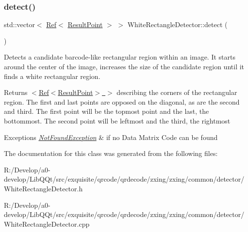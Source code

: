 \subsubsection{\texorpdfstring{detect()}{detect()}}
{\footnotesize\ttfamily std\+::vector$<$ \mbox{\hyperlink{classzxing_1_1_ref}{Ref}}$<$ \mbox{\hyperlink{classzxing_1_1_result_point}{Result\+Point}} $>$ $>$ White\+Rectangle\+Detector\+::detect (\begin{DoxyParamCaption}{ }\end{DoxyParamCaption})}

Detects a candidate barcode-\/like rectangular region within an image. It starts around the center of the image, increases the size of the candidate region until it finds a white rectangular region. 

\begin{DoxyReturn}{Returns}
\mbox{\hyperlink{}{$<$Ref$<$\+Result\+Point$>$ $>$}} describing the corners of the rectangular region. The first and last points are opposed on the diagonal, as are the second and third. The first point will be the topmost point and the last, the bottommost. The second point will be leftmost and the third, the rightmost 
\end{DoxyReturn}

\begin{DoxyExceptions}{Exceptions}
{\em \mbox{\hyperlink{classzxing_1_1_not_found_exception}{Not\+Found\+Exception}}} & if no Data Matrix Code can be found \\
\hline
\end{DoxyExceptions}


The documentation for this class was generated from the following files\+:\begin{DoxyCompactItemize}
\item 
R\+:/\+Develop/a0-\/develop/\+Lib\+Q\+Qt/src/exquisite/qrcode/qrdecode/zxing/zxing/common/detector/White\+Rectangle\+Detector.\+h\item 
R\+:/\+Develop/a0-\/develop/\+Lib\+Q\+Qt/src/exquisite/qrcode/qrdecode/zxing/zxing/common/detector/White\+Rectangle\+Detector.\+cpp\end{DoxyCompactItemize}
